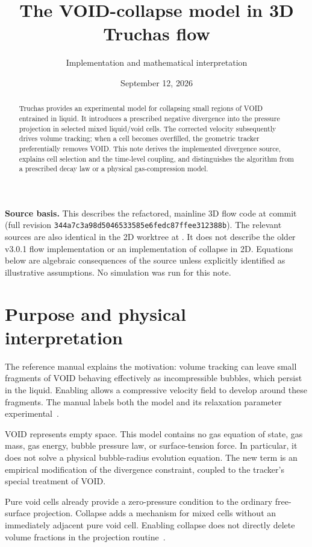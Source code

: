 \documentclass[11pt,letterpaper]{article}
\title{The VOID-collapse model in 3D Truchas flow}
\author{Implementation and mathematical interpretation}
\date{September 12, 2026}
\newcommand{\code}[1]{\texttt{\detokenize{#1}}}
\newcommand{\rev}{344a7c3a98d5046533585e6fedc87ffee312388b}
\begin{document}
\maketitle

\begin{abstract}
Truchas provides an experimental model for collapsing small regions of VOID
entrained in liquid. It introduces a prescribed negative divergence into the
pressure projection in selected mixed liquid/void cells. The corrected
velocity subsequently drives volume tracking; when a cell becomes overfilled,
the geometric tracker preferentially removes VOID. This note derives the
implemented divergence source, explains cell selection and the time-level
coupling, and distinguishes the algorithm from a prescribed decay law or a
physical gas-compression model.
\end{abstract}

\textbf{Source basis.} This describes the refactored, mainline 3D flow code at
commit \code{344a7c3a} (full revision \texttt{\rev}). The relevant sources are
also identical in the 2D worktree at \code{ba178536}. It does not describe
the older v3.0.1 flow implementation or an implementation of collapse in 2D.
Equations below are algebraic consequences of the source unless explicitly
identified as illustrative assumptions. No simulation was run for this note.

\section{Purpose and physical interpretation}

The reference manual explains the motivation: volume tracking can leave
small fragments of VOID behaving effectively as incompressible bubbles,
which persist in the liquid. Enabling \code{void_collapse} allows a
compressive velocity field to develop around these fragments. The manual
labels both the model and its relaxation parameter experimental~\cite{manual}.

VOID represents empty space. This model contains no gas equation of state,
gas mass, gas energy, bubble pressure law, or surface-tension force. In
particular, it does not solve a physical bubble-radius evolution equation.
The new term is an empirical modification of the divergence constraint,
coupled to the tracker's special treatment of VOID.

Pure void cells already provide a zero-pressure condition to the ordinary
free-surface projection. Collapse adds a mechanism for mixed cells without
an immediately adjacent pure void cell. Enabling collapse does not directly
delete volume fractions in the projection routine~\cite{projection,tracker}.
\end{document}
